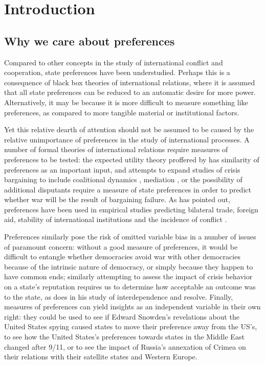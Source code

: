 \setcounter{section}{1}

\section{Introduction}

\subsection{Why we care about preferences}

Compared to other concepts in the study of international conflict and cooperation, state preferences have been understudied. Perhaps this is a consequence of black box theories of international relations, where it is assumed that all state preferences can be reduced to an automatic desire for more power. Alternatively, it may be because it is more difficult to measure something like preferences, as compared to more tangible material or institutional factors.

Yet this relative dearth of attention should not be assumed to be caused by the relative unimportance of preferences in the study of international processes. A number of formal theories of international relations require measures of preferences to be tested: the expected utility theory proffered by \citep{buenodemesquita:1983} has similarity of preferences as an important input, and attempts to expand studies of crisis bargaining to include coalitional dynamics \citep{wolford:2014}, mediation \citep{kydd:2006}, or the possibility of additional disputants \citep{gallop:2017} require a measure of state preferences in order to predict whether war will be the result of bargaining failure. As \citet{hage:2011} has pointed out, preferences have been used in empirical studies predicting bilateral trade, foreign aid, stability of international institutions and the incidence of conflict \citep{kastner:2007, derouen:heo:2004, stone:2004, gartzke:2007, braumoeller:2008}. 

Preferences similarly pose the risk of omitted variable bias in a number of issues of paramount concern: without a good measure of preferences, it would be difficult to entangle whether democracies avoid war with other democracies because of the intrinsic nature of democracy, or simply because they happen to have common ends; similarly attempting to assess the impact of crisis behavior on a state's reputation requires us to determine how acceptable an outcome was to the state, as \citep{crescenzi:200X} does in his study of interdependence and resolve. Finally, measures of preferences can yield insights as an independent variable in their own right: they could be used to see if Edward Snowden's revelations about the United States spying caused states to move their preference away from the US's, to see how the United States's preferences towards states in the Middle East changed after 9/11, or to see the impact of Russia's annexation of Crimea on their relations with their satellite states and Western Europe.